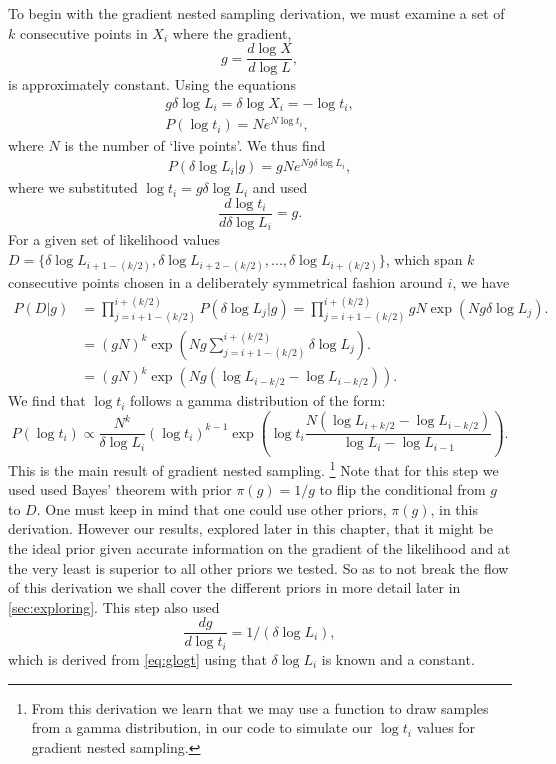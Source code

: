To begin with the gradient nested sampling derivation, we must examine a set of $k$ consecutive points in ${X_i}$ where the gradient,
\begin{equation}
g= \frac{d \log X}{d \log L},
\label{eq:ggg}
\end{equation}
%
is approximately constant. Using the equations 
%
\begin{align}
g \delta \log L_{i} = \delta \log X_i= -\log t_i, \\
P(\log t_{i})=Ne^{N \log t_i},
\label{eq:glogt}
\end{align}
%
where $N$ is the number of `live points'. We thus find
%
\begin{align}
P(\delta \log L_i|g)= gNe^{Ng \delta \log L_i},
\end{align}
%
where we substituted  $\log t_i= g\delta \log L_i$ and used 
\begin{equation}
    \frac{d \log t_i}{d\delta \log L_i}= g.
\end{equation}
For a given set of likelihood values $D= \{ \delta \log L_{i+1-(k/2)},\delta \log L_{i+2-(k/2)},...,\delta \log L_{i+(k/2)} \}$, which span $k$ consecutive points chosen in a deliberately symmetrical fashion around $i$, we have
%
\begin{align}
P(D|g)&= \prod_{j=i+1-(k/2)}^{i+(k/2)} P(\delta \log L_j|g) = \prod_{j=i+1-(k/2)}^{i+(k/2)} gN \exp (Ng \delta \log L_j).\\
&=  (gN)^k\exp\left(Ng \sum_{j=i+1-(k/2)}^{i+(k/2)}\delta \log L_j\right).\\
&=  (gN)^k\exp\left(Ng (\log L_{i-k/2} - \log L_{i-k/2})\right).
\end{align}
%
We find that $\log t_i$ follows a gamma distribution \cite{hogg_craig_1971} of the form:
%
\begin{equation}
P(\log t_i) \propto \frac{N^k}{\delta \log L_i}(\log t_i)^{k-1} \exp \left( \log t_i \frac{N(\log L_{i+k/2}-\log L_{i-k/2})}{\log L_i-\log L_{i-1}} \right).
\label{eq:blab}
\end{equation}
%
This is the main result of gradient nested sampling. \footnote{From this derivation we learn that we may use a function to draw samples from a gamma distribution, in our code to simulate our $\log t_i$ values for gradient nested sampling.} Note that for this step we used used Bayes' theorem with prior $\pi (g)=1/g$ to flip the conditional from $g$ to $D$. One must keep in mind that one could use other priors, $\pi(g)$, in this derivation. However our results, explored later in this chapter, that it might be the ideal prior given accurate information on the gradient of the likelihood and at the very least is superior to all other priors we tested. So as to not break the flow of this derivation we shall cover the different priors in more detail later in \cref{sec:exploring}. This step also used
%
\begin{equation}
  \frac{dg}{d\log t_i}  = 1/(\delta \log L_{i}),
\end{equation}
%
which is derived from \cref{eq:glogt} using that $\delta \log L_{i}$ is known and a constant. 

